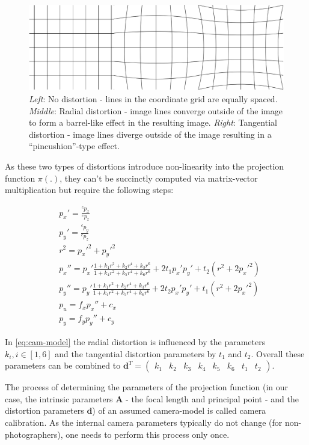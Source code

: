 \documentclass[headsepline, hidelinks, footsepline, footinclude=false, oneside, fontsize=11pt, paper=a4, listof=totoc, bibliography=totoc]{scrbook}
\begin{document}
\begin{figure}[htbp]
\centering
\includegraphics[width=.9\linewidth]{figures/distortion-types.pdf}
\caption{\label{fig:distortion}\emph{Left}: No distortion - lines in the coordinate grid are equally spaced. \emph{Middle}: Radial distortion - image lines converge outside of the image to form a barrel-like effect in the resulting image. \emph{Right}: Tangential distortion - image lines diverge outside of the image resulting in a ``pincushion''-type effect.}
\end{figure}

\newpage
As these two types of distortions introduce non-linearity into the projection function \(\pi(.)\), they can't be succinctly computed via matrix-vector multiplication but require the following steps:

\begin{equation}
\label{eq:cam-model}
\begin{split}
& p_x' = \frac{{}^{c}p_x}{{}^{c}p_z} \\
& p_y' = \frac{{}^{c}p_y}{{}^{c}p_z} \\
& r^2 = p_x'^2 + p_y'^2 \\
& p_x'' = p_x'\frac{1+k_1r^2+k_2r^4+k_3r^6}{1+k_4r^2+k_5r^4+k_6r^6} + 2t_1p_x'p_y'+t_2(r^2+2p_x'^2)\\
& p_y'' = p_y'\frac{1+k_1r^2+k_2r^4+k_3r^6}{1+k_4r^2+k_5r^4+k_6r^6} + 2t_2p_x'p_y'+t_1(r^2+2p_x'^2)\\
& p_u = f_x p_x'' + c_x \\
& p_y = f_y p_y'' + c_y
\end{split}
\end{equation}

In \cref{eq:cam-model} the radial distortion is influenced by the parameters \(k_i, i \in [1, 6]\) and the tangential distortion parameters by \(t_1\) and \(t_2\). Overall these parameters can be combined to 
\(\mathbf{d}^T = \begin{pmatrix}k_1&k_2&k_3&k_4&k_5&k_6&t_1&t_2\end{pmatrix}\).

The process of determining the parameters of the projection function (in our case, the intrinsic parameters \(\mathbf{A}\) - the focal length and principal point - and the distortion parameters \(\mathbf{d}\)) 
of an assumed camera-model is called camera calibration.
As the internal camera parameters typically do not change (for non-photographers), one needs to perform this process only once.
\end{document}
